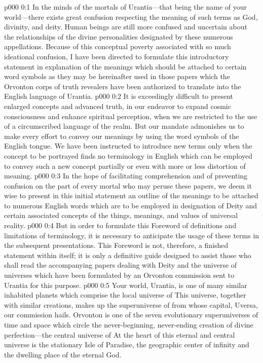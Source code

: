 \author{Divine Counselor}
\vs p000 0:1 In the minds of the mortals of Urantia---that being the name of your world---there exists great confusion respecting the meaning of such terms as God, divinity, and deity. Human beings are still more confused and uncertain about the relationships of the divine personalities designated by these numerous appellations. Because of this conceptual poverty associated with so much ideational confusion, I have been directed to formulate this introductory statement in explanation of the meanings which should be attached to certain word symbols as they may be hereinafter used in those papers which the Orvonton corps of truth revealers have been authorized to translate into the English language of Urantia.\plusone
\vs p000 0:2 It is exceedingly difficult to present enlarged concepts and advanced truth, in our endeavor to expand cosmic consciousness and enhance spiritual perception, when we are restricted to the use of a circumscribed language of the realm. But our mandate admonishes us to make every effort to convey our meanings by using the word symbols of the English tongue. We have been instructed to introduce new terms only when the concept to be portrayed finds no terminology in English which can be employed to convey such a new concept partially or even with more or less distortion of meaning.
\vs p000 0:3 In the hope of facilitating comprehension and of preventing confusion on the part of every mortal who may peruse these papers, we deem it wise to present in this initial statement an outline of the meanings to be attached to numerous English words which are to be employed in designation of Deity and certain associated concepts of the things, meanings, and values of universal reality.
\vs p000 0:4 But in order to formulate this Foreword of definitions and limitations of terminology, it is necessary to anticipate the usage of these terms in the subsequent presentations. This Foreword is not, therefore, a finished statement within itself; it is only a definitive guide designed to assist those who shall read the accompanying papers dealing with Deity and the universe of universes which have been formulated by an Orvonton commission sent to Urantia for this purpose.
\pc \vs p000 0:5 Your world, Urantia, is one of many similar inhabited planets which comprise the local universe of  This universe, together with similar creations, makes up the superuniverse of  from whose capital, Uversa, our commission hails. Orvonton is one of the seven evolutionary superuniverses of time and space which circle the never\hyp{}beginning, never\hyp{}ending creation of divine perfection---the central universe of  At the heart of this eternal and central universe is the stationary Isle of Paradise, the geographic center of infinity and the dwelling place of the eternal God.
